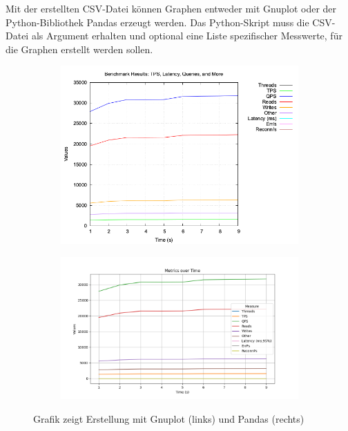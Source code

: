Mit der erstellten CSV-Datei können Graphen entweder mit Gnuplot oder der Python-Bibliothek Pandas erzeugt werden.
Das Python-Skript muss die CSV-Datei als Argument erhalten und optional eine Liste spezifischer Messwerte, für die Graphen erstellt werden sollen.

\vspace{-5pt}

\vspace{-5pt}

\vspace{-5pt}
\begin{figure}[H]
    \centering
    \begin{subfigure}[t]{0.36\textwidth}
        \includegraphics[width=\textwidth]{PNGs/Demo/sysbench_output}
    \end{subfigure}
    \hfill
    \begin{subfigure}[t]{0.48\textwidth}
        \includegraphics[width=\textwidth]{PNGs/Demo/Summary}
    \end{subfigure}
    \caption[Demo: Gnuplot vs. Pandas]{Grafik zeigt Erstellung mit Gnuplot (links) und Pandas (rechts)}
    \label{fig:demo-graph-generation}
\end{figure}
\vspace{-15pt}

